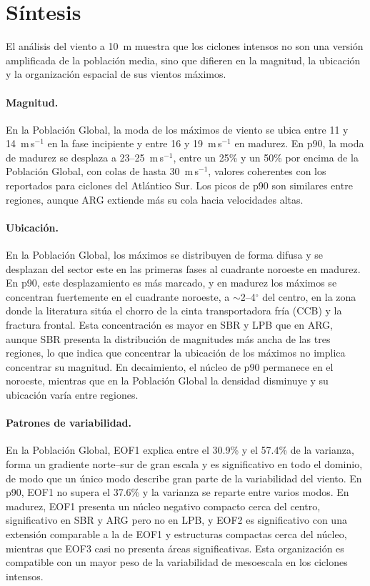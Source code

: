 \section{Síntesis}\label{sec:sintesis_wind10}

El análisis del viento a 10~m muestra que los ciclones intensos no son una versión amplificada de la población media, sino que difieren en la magnitud, la ubicación y la organización espacial de sus vientos máximos.

\paragraph{Magnitud.}
En la Población Global, la moda de los máximos de viento se ubica entre 11 y 14~m\,s$^{-1}$ en la fase incipiente y entre 16 y 19~m\,s$^{-1}$ en madurez. En p90, la moda de madurez se desplaza a 23--25~m\,s$^{-1}$, entre un 25\% y un 50\% por encima de la Población Global, con colas de hasta 30~m\,s$^{-1}$, valores coherentes con los reportados para ciclones del Atlántico Sur. Los picos de p90 son similares entre regiones, aunque ARG extiende más su cola hacia velocidades altas.

\paragraph{Ubicación.}
En la Población Global, los máximos se distribuyen de forma difusa y se desplazan del sector este en las primeras fases al cuadrante noroeste en madurez. En p90, este desplazamiento es más marcado, y en madurez los máximos se concentran fuertemente en el cuadrante noroeste, a ${\sim}$2--4$^{\circ}$ del centro, en la zona donde la literatura sitúa el chorro de la cinta transportadora fría (CCB) y la fractura frontal. Esta concentración es mayor en SBR y LPB que en ARG, aunque SBR presenta la distribución de magnitudes más ancha de las tres regiones, lo que indica que concentrar la ubicación de los máximos no implica concentrar su magnitud. En decaimiento, el núcleo de p90 permanece en el noroeste, mientras que en la Población Global la densidad disminuye y su ubicación varía entre regiones.

\paragraph{Patrones de variabilidad.}
En la Población Global, EOF1 explica entre el 30.9\% y el 57.4\% de la varianza, forma un gradiente norte--sur de gran escala y es significativo en todo el dominio, de modo que un único modo describe gran parte de la variabilidad del viento. En p90, EOF1 no supera el 37.6\% y la varianza se reparte entre varios modos. En madurez, EOF1 presenta un núcleo negativo compacto cerca del centro, significativo en SBR y ARG pero no en LPB, y EOF2 es significativo con una extensión comparable a la de EOF1 y estructuras compactas cerca del núcleo, mientras que EOF3 casi no presenta áreas significativas. Esta organización es compatible con un mayor peso de la variabilidad de mesoescala en los ciclones intensos.

